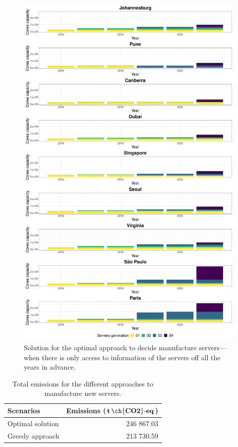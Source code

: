 \begin{figure}[ht]
\centering
  \includegraphics[width=\linewidth]{images/dc_evolution_optimal.pdf}
  \caption{Solution for the optimal approach to decide manufacture servers---when there is only access to information of the servers off all the years in advance.}
  \label{fig:dc_evolution_optimal}
\end{figure}


\begin{table}[!ht]
  
\caption{Total emissions for the different approaches to manufacture new servers.}\label{tab:emissions_sizing} \centering
\begin{tabular}{|l|r|}
  \hline
  \textbf{Scenarios} & \textbf{Emissions ($\mathbf{t\,\ch{CO2}\text{-}eq}$)}   \\
  \hline  
   Optimal solution  &   246 867.03 \\  
  \hline
   Greedy approach   &   213 730.59  \\
  \hline
\end{tabular}
\end{table}



